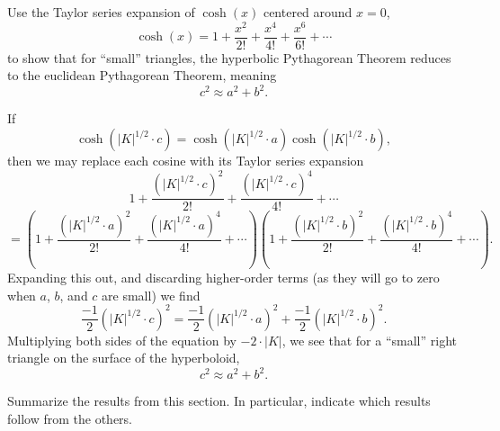 \documentclass[handout,newpage,hints,,12pt,noauthor,nooutcomes]{ximera}
\begin{document}
\begin{problem}
  Use the Taylor series expansion of $\cosh(x)$ centered around $x=0$,
  \[
  \cosh(x) = 1 + \frac{x^2}{2!} + \frac{x^4}{4!} + \frac{x^6}{6!} + \cdots
  \]
to show that for ``small'' triangles, the hyperbolic Pythagorean
Theorem reduces to the euclidean Pythagorean Theorem, meaning
\[
c^2 \approx a^2+b^2.
\]
\begin{freeResponse}
  If
  \[
  \cosh\left(|K|^{1/2}\cdot c\right)=\cosh\left(|K|^{1/2}\cdot a\right)\cosh\left(|K|^{1/2}\cdot b\right),
  \]
  then we may replace each cosine with its Taylor series expansion
  \[
  1 + \frac{\left(|K|^{1/2}\cdot c\right)^2}{2!} + \frac{\left(|K|^{1/2}\cdot c\right)^4}{4!} +  \cdots
  \]
  \[
  =\left(
  1 + \frac{\left(|K|^{1/2}\cdot a\right)^2}{2!} + \frac{\left(|K|^{1/2}\cdot a\right)^4}{4!} +  \cdots
  \right)
  \left(
  1 + \frac{\left(|K|^{1/2}\cdot b\right)^2}{2!} + \frac{\left(|K|^{1/2}\cdot b\right)^4}{4!} + \cdots
  \right).
  \]
  Expanding this out, and discarding higher-order terms (as they will
  go to zero when $a$, $b$, and $c$ are small) we find
  \[
  \frac{-1}{2}\left(|K|^{1/2}\cdot c\right)^2 = \frac{-1}{2}\left(|K|^{1/2}\cdot a\right)^2+\frac{-1}{2}\left(|K|^{1/2}\cdot b\right)^2.
  \]
  Multiplying both sides of the equation by $-2\cdot |K|$, we see that for a
  ``small'' right triangle on the surface of the hyperboloid,
  \[
  c^2 \approx a^2 +b^2.
  \]
\end{freeResponse}
\end{problem}


\begin{problem}
Summarize the results from this section. In particular, indicate which
results follow from the others.
\begin{freeResponse}
\end{freeResponse}
\end{problem}
\end{document}
